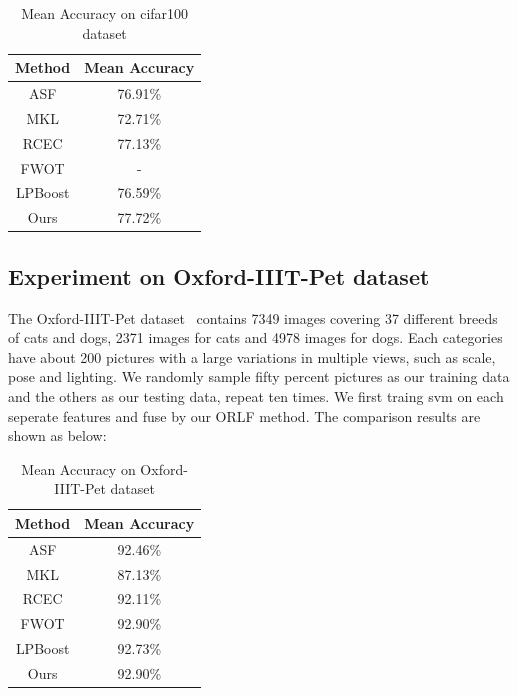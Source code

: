 \documentclass[letterpaper]{article}
\begin{document}
\begin{table}[h]\small
\centering
\label{table:cifar100}
\begin{tabular}{c|c}
\hline
Method  & Mean Accuracy \\\hline
ASF     & 76.91\%           \\
MKL     & 72.71\%           \\
RCEC    & 77.13\%           \\  %
FWOT    & -                 \\
LPBoost & 76.59\%           \\\hline
Ours    & 77.72\%           \\  %
\hline
\end{tabular}
\caption{Mean Accuracy on cifar100 dataset}
\end{table} 

\subsection{Experiment on Oxford-IIIT-Pet dataset}

The Oxford-IIIT-Pet dataset~\cite{parkhi12a} contains 7349 images covering 37 different breeds of cats and dogs, 2371 images for cats and 4978 images for dogs. 
Each categories have about 200 pictures with a large variations in multiple views, such as scale, pose and lighting.
We randomly sample fifty percent pictures as our training data and the others as our testing data, repeat ten times. We first traing svm on each seperate features and fuse by our ORLF method. The comparison results are shown as below:

\begin{table}[h]\small
\centering
\label{table:oxford_pet}
\begin{tabular}{c|c}
\hline
Method                       & Mean Accuracy     \\\hline
ASF                          & 92.46\%           \\
MKL                          & 87.13\%           \\
RCEC                         & 92.11\%           \\          %
FWOT                         & 92.90\%           \\			 
LPBoost                      & 92.73\%           \\\hline
Ours                         & 92.90\%           \\			 %
\hline
\end{tabular}
\caption{Mean Accuracy on Oxford-IIIT-Pet dataset}
\end{table}
\end{document}
